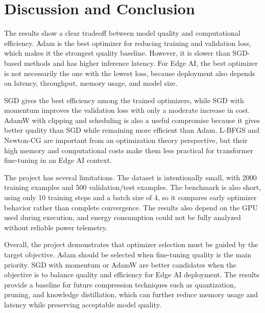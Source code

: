 \chapter{Discussion and Conclusion}

\vspace*{0.3cm}

The results show a clear tradeoff between model quality and computational
efficiency. Adam is the best optimizer for reducing training and validation loss,
which makes it the strongest quality baseline. However, it is slower than
SGD-based methods and has higher inference latency. For Edge AI, the best
optimizer is not necessarily the one with the lowest loss, because deployment
also depends on latency, throughput, memory usage, and model size.

SGD gives the best efficiency among the trained optimizers, while SGD with
momentum improves the validation loss with only a moderate increase in cost.
AdamW with clipping and scheduling is also a useful compromise because it gives
better quality than SGD while remaining more efficient than Adam. L-BFGS and
Newton-CG are important from an optimization theory perspective, but their high
memory and computational costs make them less practical for transformer
fine-tuning in an Edge AI context.

The project has several limitations. The dataset is intentionally small, with
2000 training examples and 500 validation/test examples. The benchmark is also
short, using only 10 training steps and a batch size of 4, so it compares early
optimizer behavior rather than complete convergence. The results also depend on
the GPU used during execution, and energy consumption could not be fully analyzed
without reliable power telemetry.

Overall, the project demonstrates that optimizer selection must be guided by the
target objective. Adam should be selected when fine-tuning quality is the main
priority. SGD with momentum or AdamW are better candidates when the objective is
to balance quality and efficiency for Edge AI deployment. The results provide a
baseline for future compression techniques such as quantization, pruning, and
knowledge distillation, which can further reduce memory usage and latency while
preserving acceptable model quality.
